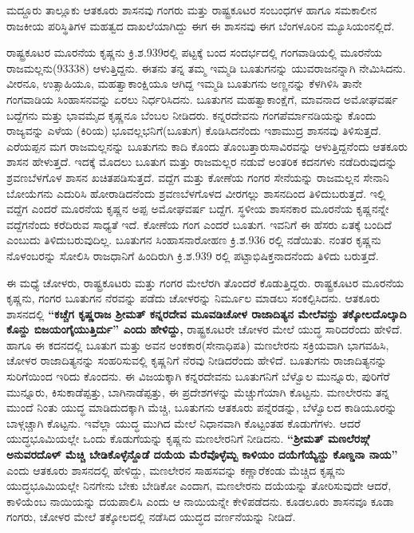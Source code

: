 ಮದ್ದೂರು ತಾಲ್ಲೂಕು ಆತಕೂರು ಶಾಸನವು ಗಂಗರು ಮತ್ತು ರಾಷ್ಟ್ರಕೂಟರ ಸಂಬಂಧಗಳ ಹಾಗೂ ಸಮಕಾಲೀನ ರಾಜಕೀಯ ಪರಿಸ್ಥಿತಿಗಳ ಮಹತ್ವದ ದಾಖಲೆಯಾಗಿದ್ದು ಈಗ ಈ ಶಾಸನವು ಈಗ ಬೆಂಗಳೂರಿನ ಮ್ಯೂಸಿಯಂನಲ್ಲಿದೆ.

ರಾಷ್ಟ್ರಕೂಟರ ಮೂರನೆಯ ಕೃಷ್ಣನು ಕ್ರಿ.ಶ.939ರಲ್ಲಿ ಪಟ್ಟಕ್ಕೆ ಬಂದ ಸಂದರ್ಭದಲ್ಲಿ ಗಂಗವಾಡಿಯಲ್ಲಿ ಮೂರನೆಯ ರಾಜಮಲ್ಲನು(933\enginline{-}38) ಆಳುತ್ತಿದ್ದನು. ಈತನು ತನ್ನ ತಮ್ಮ ಇಮ್ಮಡಿ ಬೂತುಗನನ್ನು ಯುವರಾಜನನ್ನಾಗಿ ನೇಮಿಸಿದನು. ವೀರನೂ, ಉತ್ಸಾಹಿಯೂ, ಮಹತ್ವಾಕಾಂಕ್ಷಿಯೂ ಆಗಿದ್ದ ಇಮ್ಮಡಿ ಬೂತುಗನು ಅಣ್ಣನನ್ನು ಕೆಳಗಿಳಿಸಿ ತಾನೇ ಗಂಗವಾಡಿಯ ಸಿಂಹಾಸನವನ್ನು ಏರಲು ನಿರ್ಧರಿಸಿದನು. ಬೂತುಗನ ಮಹತ್ವಾಕಾಂಕ್ಷೆಗೆ, ಮಾವನಾದ ಅಮೋಘವರ್ಷ ಬದ್ದೆಗನು ಮತ್ತು ಭಾವಮೈದ ಕೃಷ್ಣನೂ ಬೆಂಬಲ ನೀಡಿದರು. ಕನ್ನರದೇವನು ಗಂಗಪೆರ್ಮಾನಡಿಯನ್ನು ಕೊಂದು ರಾಜ್ಯವನ್ನು ಎಳೆಯ (ಕಿರಿಯ) ಭೂವಲ್ಲಭನಿಗೆ(ಬೂತುಗ) ಕೊಡಿಸಿದನೆಂದು ಇಶಾಮುದ್ರ ಶಾಸನವು ತಿಳಿಸುತ್ತದೆ. ಎರೆಯಪ್ಪನ ಮಗ ರಾಜಮಲ್ಲನನ್ನು ಬೂತುಗನು ಕಾದಿ ಕೊಂದು ತೊಂಬತ್ತಾರುಸಾವಿರವನ್ನು ಆಳುತ್ತಿದ್ದನೆಂದು ಆತಕೂರು ಶಾಸನ ಹೇಳುತ್ತದೆ. ಇದಕ್ಕೆ ಮೊದಲು ಬೂತುಗ ಮತ್ತು ರಾಜಮಲ್ಲರ ನಡುವೆ ಅಂತರಿಕ ಕದನಗಳು ನಡೆದಿರುವುದನ್ನು ಶ್ರವಣಬೆಳಗೊಳ ಶಾಸನ ಖಚಿತಪಡಿಸುತ್ತದೆ. ವದ್ದೆಗ ಮತ್ತು ಕೋಣೆಯ ಗಂಗರ ಸೇನೆಯನ್ನು ರಾಜಮಲ್ಲನ ಸೇನಾನಿ ಬೋಯೆಗನು ಎದುರಿಸಿ ಹೋರಾಡಿದನೆಂದು ಶ್ರವಣಬೆಳಗೊಳದ ವೀರಗಲ್ಲು ಶಾಸನದಿಂದ ತಿಳಿದುಬರುತ್ತದೆ. ಇಲ್ಲಿ ವದ್ದೆಗ ಎಂದರೆ ಮೂರನೆಯ ಕೃಷ್ಣನ ಅಪ್ಪ ಅಮೋಘವರ್ಷ ಬದ್ದೆಗ. ಸ್ಥಳೀಯ ಶಾಸನಕಾರ ಮೂರನೆಯ ಕೃಷ್ಣನನ್ನೇ ವದ್ದೆಗನೆಂದು ಕರೆದಿರುವ ಸಾಧ್ಯತೆ ಇದೆ. ಕೋಣೆಯ ಗಂಗ ಎಂದರೆ ಬೂತುಗ. ಇವನಿಗೆ ಈ ಹೆಸರು ಏತಕ್ಕೆ ಬಂದಿದೆ ಎಂಬುದು ತಿಳಿದುಬರುವುದಿಲ್ಲ. ಬೂತುಗನ ಸಿಂಹಾಸನಾರೋಹಣ ಕ್ರಿ.ಶ.936 ರಲ್ಲಿ ನಡೆಯಿತು. ನಂತರ ಕೃಷ್ಣನು ನೊಳಂಬರನ್ನು ಸೋಲಿಸಿ ರಾಜಧಾನಿಗೆ ಹಿಂದಿರುಗಿ ಕ್ರಿ.ಶ.939 ರಲ್ಲಿ ಪಟ್ಟಾಭಿಷಿಕ್ತನಾದನೆಂದು ತಿಳಿದು ಬರುತ್ತದೆ.

ಈ ಮಧ್ಯೆ ಚೋಳರು, ರಾಷ್ಟ್ರಕೂಟರು ಮತ್ತು ಗಂಗರ ಮೇಲೆರಗಿ ತೊಂದರೆ ಕೊಡುತ್ತಿದ್ದರು. ರಾಷ್ಟ್ರಕೂಟರ ಮೂರನೆಯ ಕೃಷ್ಣನು, ಗಂಗರ ಬೂತುಗನ ನೆರವನ್ನು ಪಡೆದು ಚೋಳರನ್ನು ನಿರ್ಮೂಲ ಮಾಡಲು ಸಂಕಲ್ಪಿಸಿದನು. ಆತಕೂರು ಶಾಸನದಲ್ಲಿ \textbf{“ಕಚ್ಚೆಗ ಕೃಷ್ಣರಾಜ ಶ‍್ರೀಮತ್​ ಕನ್ನರದೇವ ಮೂವಡಿಚೋಳ ರಾಜಾದಿತ್ಯನ ಮೇಲೆವನ್ದು ತಕ್ಕೋಲದೊಲ್ಕಾದಿ ಕೊನ್ದು ಬಿಜಯಂಗೈಯುತ್ತಿರ್ದು” ಎಂದು ಹೇಳಿದ್ದು, }ರಾಷ್ಟ್ರಕೂಟರೇ ಚೋಳರ ಮೇಲೆ ಯುದ್ಧ ಸಾರಿದರೆಂದು ಹೇಳಿದೆ. ಹಾಗೂ ಈ ಕದನದಲ್ಲಿ ಬೂತುಗ ಮತ್ತು ಅವನ ಅಂಕಕಾರ(ಸೇನಾಧಿಪತಿ) ಮಣಲೇರನು ಸಕ್ರಿಯವಾಗಿ ಭಾಗವಹಿಸಿ, ಚೋಳರ ರಾಜಾದಿತ್ಯನನ್ನು ಸಂಹರಿಸುವಲ್ಲಿ ಕೃಷ್ಣನಿಗೆ ನೆರವು ನೀಡಿದರೆಂದು ಹೇಳಿದೆ. ಬೂತುಗನು ರಾಜಾದಿತ್ಯನನ್ನು ಸುರಿಗೆಯಿಂದ ಇರಿದು ಕೊಂದನು. ಈ ವಿಜಯಕ್ಕಾಗಿ ಕನ್ನರದೇವನು ಬೂತುಗನಿಗೆ ಬೆಳ್ವೊಲ ಮುನ್ನೂರು, ಪುರಿಗೆರೆ ಮುನ್ನೂರು, ಕಿಸುಕಾಡೆಪ್ಪತ್ತು, ಬಾಗಿನಾಡೆಪ್ಪತ್ತು, ಈ ಪ್ರದೇಶಗಳನ್ನು ಮೆಚ್ಚುಗೆಯಾಗಿ ಕೊಟ್ಟನು. ಮಣಲೇರನು ತನ್ನ ಮುಂದೆ ನಿಂತು ಯುದ್ಧ ಮಾಡಿದುದಕ್ಕಾಗಿ ಮೆಚ್ಚಿ, ಬೂತುಗನು ಆತಕೂರು ಪನ್ನೆರಡನ್ನು, ಬೆಳ್ವೊಲದ ಕಾಡಿಯೂರನ್ನು ಬಾಳ್ಗಚ್ಚಾಗಿ ಕೊಟ್ಟನು. ಇವೆಲ್ಲಾ ಯುದ್ಧ ಮುಗಿದ ಮೇಲೆ ನಿಧಾನವಾಗಿ ಕೊಟ್ಟಂತಹ ಕೊಡುಗೆಗಳು. ಆದರೆ ಯುದ್ಧಭೂಮಿಯಲ್ಲೇ ಒಂದು ಕೊಡುಗೆಯನ್ನು ಕೃಷ್ಣನು ಮಣಲೇರನಿಗೆ ನೀಡಿದನು. \textbf{“ಶ‍್ರೀಮತ್​ ಮಣಲೆರಙ್ಗೆ ಅನುವರದೊಳ್​ ಮೆಚ್ಚಿ ಬೇಡಿಕೊಳ್ಳೆನ್ದೊಡೆ ದಯೆಯ ಮೆರೆವೊಳ್ಳೆಮ್ಬ ಕಾಳಿಯಂ ದಯೆಗೆಯ್ಯೆನ್ದು ಕೊಣ್ಡನಾ ನಾಯ”} ಎಂದು ಆತಕೂರು ಶಾಸನದಲ್ಲಿ ಹೇಳಿದ್ದು, ಮಣಲೇರನ ಸಾಹಸವನ್ನು ಕಣ್ಣಾರೆಕಂಡು ಮೆಚ್ಚಿದ ಕೃಷ್ಣನು ಯುದ್ಧಭೂಮಿಯಲ್ಲೇ ನಿನಗೇನು ಬೇಕು ಬೇಡಿಕೋ ಎಂದಾಗ, ಮಣಲೇರನು ದಯೆಯನ್ನು ತೋರಿಸುವುದೇ ಆದರೆ, ಕಾಳಿಯೆಂಬ ನಾಯಿಯನ್ನು ದಯಪಾಲಿಸಿ ಎಂದು ಆ ನಾಯಿಯನ್ನೇ ಕೇಳಿಪಡೆದನು. ಕೂಡಲೂರು ಶಾಸನವೂ ಕೂಡಾ ಗಂಗರು, ಚೋಳರ ಮೇಲೆ ತಕ್ಕೋಲದಲ್ಲಿ ನಡೆಸಿದ ಯುದ್ಧದ ವರ್ಣನೆಯನ್ನು ನೀಡಿದೆ.

